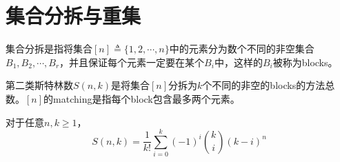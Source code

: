 \section{集合分拆与重集}
\begin{definition}[集合分拆]
	集合分拆是指将集合$[n] \triangleq \{1, 2, \cdots, n\}$中的元素分为数个不同的非空集合$B_1, B_2, \cdots, B_r$，并且保证每个元素一定要在某个$B_i$中，这样的$B_i$被称为blocks。
\end{definition}
\begin{definition}
	第二类斯特林数$S(n, k)$是将集合$[n]$分拆为$k$个不同的非空的blocks的方法总数。$[n]$的matching是指每个block包含最多两个元素。
\end{definition}
\begin{proposition}
	对于任意$n, k \geq 1$，
	\begin{equation*}
		S(n, k) = \frac{1}{k!}\sum\limits_{i=0}^k (-1)^i\binom{k}{i}(k-i)^n
	\end{equation*}
\end{proposition}
